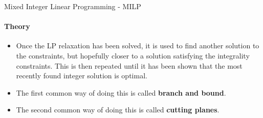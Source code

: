 \documentclass{beamer}
\begin{document}
	\begin{frame}{Mixed Integer Linear Programming - MILP}
		\framesubtitle{Theory}
		\begin{itemize}
			\item Once the LP relaxation has been solved, it is used to find another solution to the constraints, but hopefully closer to a solution satisfying the integrality constraints. This is then repeated until it has been shown that the most recently found integer solution is optimal.
			\item The first common way of doing this is called \textbf{branch and bound}.
			\item The second common way of doing this is called \textbf{cutting planes}.
		\end{itemize}
	\end{frame}
%
%
\end{document}
